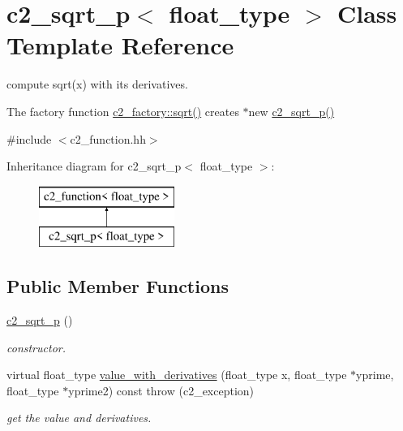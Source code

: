 \hypertarget{classc2__sqrt__p}{\section{c2\-\_\-sqrt\-\_\-p$<$ float\-\_\-type $>$ Class Template Reference}
\label{classc2__sqrt__p}
}


compute sqrt(x) with its derivatives.

The factory function \hyperlink{classc2__factory_a5b189f66ec65267f3812cdc45ccf072d}{c2\-\_\-factory\-::sqrt()} creates $\ast$new \hyperlink{classc2__sqrt__p_a780a0f48a8fb428b2cb9fac74b7b56e7}{c2\-\_\-sqrt\-\_\-p()}  




{\ttfamily \#include $<$c2\-\_\-function.\-hh$>$}

Inheritance diagram for c2\-\_\-sqrt\-\_\-p$<$ float\-\_\-type $>$\-:\begin{figure}[H]
\begin{center}
\leavevmode
\includegraphics[height=2.000000cm]{classc2__sqrt__p}
\end{center}
\end{figure}
\subsection*{Public Member Functions}
\begin{DoxyCompactItemize}
\item 
\hypertarget{classc2__sqrt__p_a780a0f48a8fb428b2cb9fac74b7b56e7}{\hyperlink{classc2__sqrt__p_a780a0f48a8fb428b2cb9fac74b7b56e7}{c2\-\_\-sqrt\-\_\-p} ()}\label{classc2__sqrt__p_a780a0f48a8fb428b2cb9fac74b7b56e7}

\begin{DoxyCompactList}\small\item\em constructor. \end{DoxyCompactList}\item 
virtual float\-\_\-type \hyperlink{classc2__sqrt__p_aef50454e3f093a7e956c3a994b46ce9d}{value\-\_\-with\-\_\-derivatives} (float\-\_\-type x, float\-\_\-type $\ast$yprime, float\-\_\-type $\ast$yprime2) const   throw (c2\-\_\-exception)
\begin{DoxyCompactList}\small\item\em get the value and derivatives. \end{DoxyCompactList}\end{DoxyCompactItemize}
